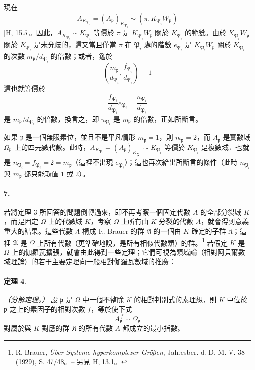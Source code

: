 \documentclass[11pt]{article}
\begin{document}
現在
\[
        A_{K_{\mathfrak P_i}}=(A_{\mathfrak p})_{K_{\mathfrak P_i}}\sim(\pi,K_{\mathfrak P_i}W_{\mathfrak p})
\]
[H, 15.5]。因此，\(A_{K_{\mathfrak P_i}}\sim K_{\mathfrak P_i}\) 等價於 \(\pi\) 是 \(K_{\mathfrak P_i}W_{\mathfrak p}\) 關於 \(K_{\mathfrak P_i}\) 的範數。由於 \(K_{\mathfrak P_i}W_{\mathfrak p}\) 關於 \(K_{\mathfrak P_i}\) 是未分歧的，這又當且僅當 \(\pi\) 在 \(\mathfrak P_i\) 處的階數 \(e_{\mathfrak P_i}\) 是 \(K_{\mathfrak P_i}W_{\mathfrak p}\) 關於 \(K_{\mathfrak P_i}\) 的次數 \(m_{\mathfrak p}/d_{\mathfrak P_i}\) 的倍數；或者，鑑於
\[
\left(\frac{m_{\mathfrak p}}{d_{\mathfrak P_i}},\frac{f_{\mathfrak P_i}}{d_{\mathfrak P_i}}\right)=1
\]
這也就等價於
\[
\frac{f_{\mathfrak P_i}}{d_{\mathfrak P_i}}e_{\mathfrak P_i}=\frac{n_{\mathfrak P_i}}{d_{\mathfrak P_i}}
\]
是 \(m_{\mathfrak p}/d_{\mathfrak P_i}\) 的倍數，換言之，即 \(n_{\mathfrak P_i}\) 是 \(m_{\mathfrak p}\) 的倍數，正如所斷言。

如果 \(\mathfrak p\) 是一個無限素位，並且不是平凡情形 \(m_{\mathfrak p}=1\)，則 \(m_{\mathfrak p}=2\)，而 \(A_{\mathfrak p}\) 是實數域 \(\Omega_{\mathfrak p}\) 上的四元數代數。此時，\(A_{K_{\mathfrak P_i}}=(A_{\mathfrak p})_{K_{\mathfrak P_i}}\sim K_{\mathfrak P_i}\) 等價於 \(K_{\mathfrak P_i}\) 是複數域，也就是 \(n_{\mathfrak P_i}=f_{\mathfrak P_i}=2=m_{\mathfrak p}\)（這裡不出現 \(e_{\mathfrak P_i}\)）；這也再次給出所斷言的條件（此時 \(n_{\mathfrak P_i}\) 與 \(m_{\mathfrak p}\) 都只能取值 1 或 2）。

\paragraph{7.}
若將定理 3 所回答的問題倒轉過來，即不再考察一個固定代數 \(A\) 的全部分裂域 \(K\)，而是固定 \(\Omega\) 上的代數域 \(K\)，考察 \(\Omega\) 上所有由 \(K\) 分裂的代數 \(A\)，就會得到意義重大的結果。這些代數 \(A\) 構成 R. Brauer 的群 \(\mathfrak A\) 的一個由 \(K\) 確定的子群 \(\mathfrak K\)；這裡 \(\mathfrak A\) 是 \(\Omega\) 上所有代數（更準確地說，是所有相似代數類）的群。\footnote{R. Brauer, \emph{Über Systeme hyperkomplexer Größen}, Jahresber. d. D. M.-V. 38 (1929), S. 47/48。-- 另見 H, 13.1。} 若假定 \(K\) 是 \(\Omega\) 上的伽羅瓦擴張，就會由此得到一些定理；它們可視為類域論（相對阿貝爾數域理論）的若干主要定理向一般相對伽羅瓦數域的推廣：

\paragraph{定理 4.}
\emph{（分解定理。）} 設 \(\mathfrak p\) 是 \(\Omega\) 中一個不整除 \(K\) 的相對判別式的素理想，則 \(K\) 中位於 \(\mathfrak p\) 之上的素因子的相對次數 \(f\)，等於使下式
\[
        A_{\mathfrak p}^{\,f}\sim\Omega_{\mathfrak p}
\]
對屬於與 \(K\) 對應的群 \(\mathfrak K\) 的所有代數 \(A\) 都成立的最小指數。
\end{document}
